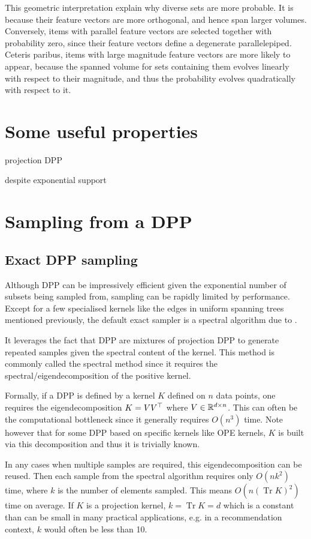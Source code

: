 This geometric interpretation explain why diverse sets are more probable. It is because their feature vectors are more orthogonal, and hence span larger volumes. Conversely, items with parallel feature vectors are selected together with probability zero, since their feature vectors define a degenerate parallelepiped. Ceteris paribus, items with large magnitude feature vectors are more likely to appear, because the spanned volume for sets containing them evolves linearly with respect to their magnitude, and thus the probability evolves quadratically with respect to it.


\section{Some useful properties}
projection DPP

despite exponential support




\section{Sampling from a DPP}
\subsection{Exact DPP sampling}


Although DPP can be impressively efficient given the exponential number of subsets being sampled from, sampling can be rapidly limited by performance. 
Except for a few specialised kernels like the edges in uniform spanning trees mentioned previously, the default exact sampler is a spectral algorithm due to \cite{hough2006_hkpv}.

It leverages the fact that DPP are mixtures of projection DPP to generate repeated samples given the spectral content of the kernel. This method is commonly called the spectral method since it requires the spectral/eigendecomposition of the positive kernel. 

Formally, if a DPP is defined by a kernel $K$ defined on $n$ data points, one requires the eigendecomposition $K= V V^\top$  where $V \in \mathbb{R}^{d \times n}$. 
This can often be the computational bottleneck since it generally requires $O(n^3)$ time. Note however that for some DPP based on specific kernels like OPE kernels, $K$ is built via this decomposition and thus it is trivially known.

In any cases when multiple samples are required, this eigendecomposition can be reused. Then each sample from the spectral algorithm requires only $O(n k^2)$ time, where $k$ is the number of elements sampled. This means $O(n (\operatorname{Tr} K)^2)$ time on average. If $K$ is a projection kernel, $k = \operatorname{Tr} K = d$ which is a constant than can be small in many practical applications, e.g. in a recommendation context, $k$ would often be less than 10.

